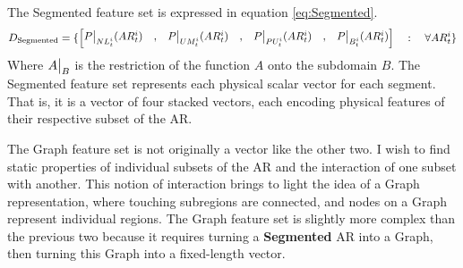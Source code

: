 \documentclass[defaultstyle,11pt]{thesis}
\begin{document}
The Segmented feature set is expressed in equation \ref{eq:Segmented}.
\begin{equation}
    D_{\text{Segmented}} = \{
    \begin{bmatrix}
    \restr{P}{NL_t^i}(AR_t^i) & , & \restr{P}{UM_t^i}(AR_t^i) & , & \restr{P}{PU_t^i}(AR_t^i) & , & \restr{P}{B_t^i}(AR_t^i)
    \end{bmatrix} \quad : \quad \forall AR_t^i \}
    \label{eq:Segmented}
\end{equation}
Where $\restr{A}{B}$ is the restriction of the function $A$ onto the subdomain $B$. The Segmented feature set represents each physical scalar vector for each segment. That is, it is a vector of four stacked vectors, each encoding physical features of their respective subset of the AR.

The Graph feature set is not originally a vector like the other two. I wish to find static properties of individual subsets of the AR and the interaction of one subset with another. This notion of interaction brings to light the idea of a Graph representation, where touching subregions are connected, and nodes on a Graph represent individual regions. The Graph feature set is slightly more complex than the previous two because it requires turning a \textbf{Segmented} AR into a Graph, then turning this Graph into a fixed-length vector.
\end{document}
